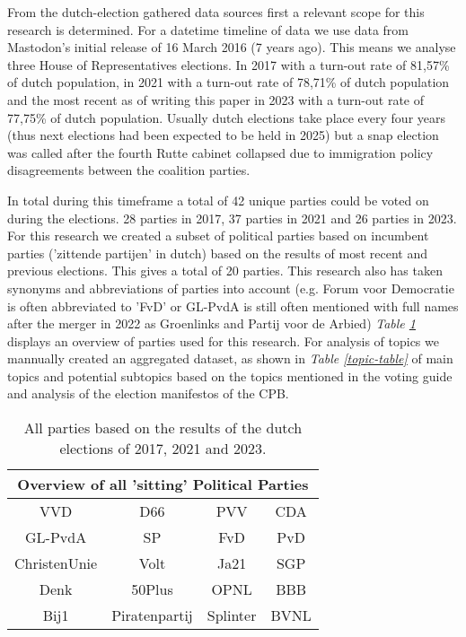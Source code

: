 From the dutch-election gathered data sources first a relevant scope for this research is determined. For a datetime timeline of data we use data from Mastodon's initial release of 16 March 2016 (7 years ago). This means we analyse three House of Representatives elections. In 2017 with a turn-out rate of 81,57\% of dutch population, in 2021 with a turn-out rate of 78,71\% of dutch population and the most recent as of writing this paper in 2023 with a turn-out rate of 77,75\% of dutch population. Usually dutch elections take place every four years (thus next elections  had been expected to be held in 2025) but a snap election was called after the fourth Rutte cabinet collapsed due to immigration policy disagreements between the coalition parties.

In total during this timeframe a total of 42 unique parties could be voted on during the elections. 28 parties in 2017, 37 parties in 2021 and 26 parties in 2023. For this research we created a subset of political parties based on incumbent parties ('zittende partijen' in dutch) based on the results of most recent and previous elections. This gives a total of 20 parties. This research also has taken synonyms and abbreviations of parties into account (e.g. Forum voor Democratie is often abbreviated to 'FvD' or GL-PvdA is still often mentioned with full names after the merger in 2022 as Groenlinks and Partij voor de Arbied) \textit{Table \ref{party-table}} displays an overview of parties used for this research. For analysis of topics we mannually created an aggregated dataset, as shown in \textit{Table \ref{topic-table}} of main topics and potential subtopics based on the topics mentioned in the voting guide and analysis of the election manifestos of the CPB.  \\

\begin{table}
\begin{center}
\begin{tabular}{||c c c c||} 
 \hline
 \multicolumn{4}{|c|}{\textbf{Overview of all 'sitting' Political Parties}} \\
 \hline
 VVD & D66 & PVV & CDA \\
 \hline
 GL-PvdA & SP & FvD & PvD \\
 \hline
 ChristenUnie & Volt & Ja21 & SGP \\
 \hline
 Denk & 50Plus & OPNL & BBB \\
 \hline
 Bij1 & Piratenpartij &  Splinter & BVNL  \\ [1ex] 
 \hline
 
\end{tabular}
\\
\caption{\label{party-table}All parties based on the results of the dutch elections of 2017, 2021 and 2023.}
\end{center}
\end{table}

